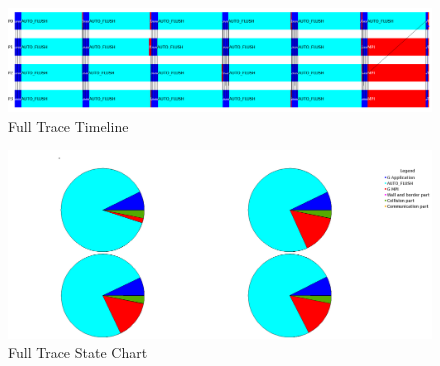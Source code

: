 \documentclass[a4paper, 12pt]{article}
\begin{document}
\begin{figure}[h]
        \centering
        \includegraphics[width=\textwidth]{event_timeline_loop_state.png}
        \caption{Full Trace Timeline}
        \label{fig:ftt}
\end{figure}

\begin{figure}[h]
        \centering
        \includegraphics[width=\textwidth]{loop_state_chart.png}
        \caption{Full Trace State Chart}
        \label{fig:ftsc}
\end{figure}
\end{document}
